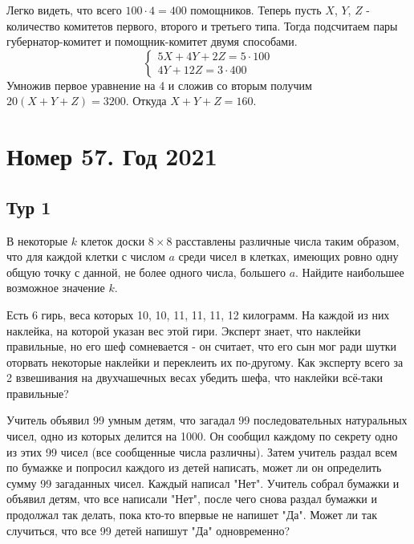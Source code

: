 \documentclass[11pt, a4paper]{problems_template}
\begin{document}
\begin{Solution}
Легко видеть, что всего $100 \cdot 4 = 400$ помощников. Теперь пусть $X$, $Y$, $Z$ - количество комитетов первого, второго и третьего типа. Тогда подсчитаем пары губернатор-комитет и помощник-комитет двумя способами.
$$
\begin{cases}
5X + 4Y + 2Z = 5 \cdot 100 \\
4Y + 12Z = 3 \cdot 400
\end{cases}
$$
Умножив первое уравнение на 4 и сложив со вторым получим $20(X + Y + Z) = 3200$. Откуда $X + Y + Z = 160$.
\end{Solution}

\chapter{Номер 57. Год 2021}

\section{Тур 1}

\begin{exercise}
В некоторые $k$ клеток доски $8 \times 8$ расставлены различные числа таким образом, что для каждой клетки с числом $a$ среди чисел в клетках, имеющих ровно одну общую точку с данной, не более одного числа, большего $a$. Найдите наибольшее возможное значение $k$.
\end{exercise}

\begin{exercise}
Есть 6 гирь, веса которых 10, 10, 11, 11, 11, 12 килограмм. На каждой из них наклейка, на которой указан вес этой гири. Эксперт знает, что наклейки правильные, но его шеф сомневается - он считает, что его сын мог ради шутки оторвать некоторые наклейки и переклеить их по-другому. Как эксперту всего за 2 взвешивания на
двухчашечных весах убедить шефа, что наклейки всё-таки правильные?
\end{exercise}

\begin{exercise}
Учитель объявил 99 умным детям, что загадал 99 последовательных натуральных чисел, одно из которых делится на 1000. Он сообщил каждому по секрету одно из этих 99 чисел (все сообщенные числа различны). Затем учитель раздал всем по бумажке и попросил каждого из детей написать, может ли он определить сумму 99 загаданных чисел. Каждый написал "Нет". Учитель собрал бумажки и объявил
детям, что все написали "Нет", после чего снова раздал бумажки и продолжал так делать, пока кто-то впервые не напишет "Да". Может ли так случиться, что все 99 детей напишут "Да" одновременно?
\end{exercise}
\end{document}
